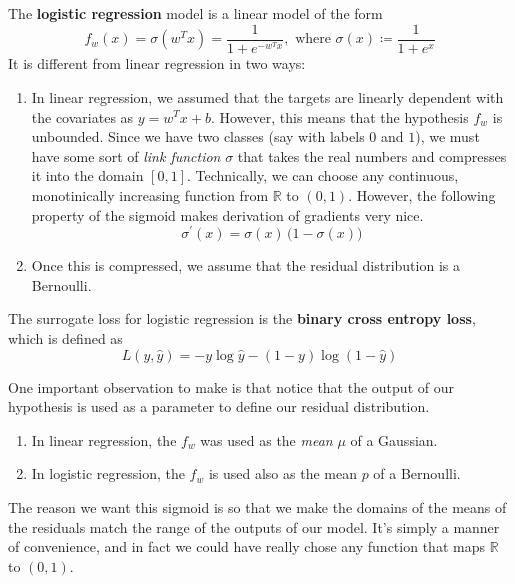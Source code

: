 \documentclass{article}
\begin{document}
    \begin{definition}
      The \textbf{logistic regression} model is a linear model of the form 
      \begin{equation}
        f_w (x) = \sigma (w^T x) = \frac{1}{1 + e^{- w^T x}}, \text{ where } \sigma(x) \coloneqq \frac{1}{1 + e^{x}}
      \end{equation}
      It is different from linear regression in two ways: 
      \begin{enumerate}
        \item In linear regression, we assumed that the targets are linearly dependent with the covariates as $y = w^T x + b$. However, this means that the hypothesis $f_w$ is unbounded. Since we have two classes (say with labels $0$ and $1$), we must have some sort of \textit{link function} $\sigma$ that takes the real numbers and compresses it into the domain $[0, 1]$. Technically, we can choose any continuous, monotinically increasing function from $\mathbb{R}$ to $(0, 1)$. However, the following property of the sigmoid makes derivation of gradients very nice. 
          \begin{equation}
            \sigma^\prime (x) = \sigma(x) \, \big(1 - \sigma(x) \big)
          \end{equation}
        \item Once this is compressed, we assume that the residual distribution is a Bernoulli. 
      \end{enumerate}
    \end{definition}

    \begin{definition}
      The surrogate loss for logistic regression is the \textbf{binary cross entropy loss}, which is defined as
      \begin{equation}
        L(y, \hat{y}) = -y \log \hat{y} - (1 - y) \log (1 - \hat{y})
      \end{equation}
    \end{definition}

    One important observation to make is that notice that the output of our hypothesis is used as a parameter to define our residual distribution. 
    \begin{enumerate}
      \item In linear regression, the $f_w$ was used as the \textit{mean} $\mu$ of a Gaussian. 
      \item In logistic regression, the $f_w$ is used also as the mean $p$ of a Bernoulli. 
    \end{enumerate}
    The reason we want this sigmoid is so that we make the domains of the means of the residuals match the range of the outputs of our model. It's simply a manner of convenience, and in fact we could have really chose any function that maps $\mathbb{R}$ to $(0, 1)$. 
\end{document}
